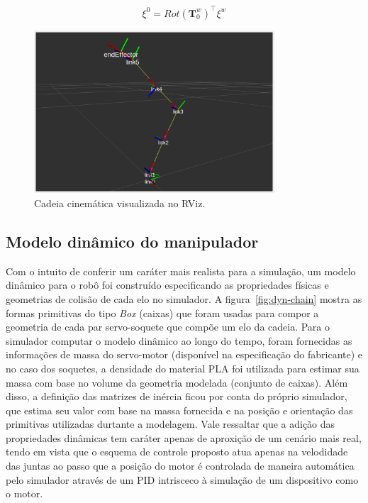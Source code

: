 \begin{equation}
    \xi^0 = {Rot(\mathbf{T}^w_0)}^\top \xi^w
\end{equation}

\begin{figure}
    \centering
    \includegraphics[width=0.8\textwidth]{./Images/rviz-chain.png}
    \caption{Cadeia cinemática visualizada no RViz.}\label{fig:kin-chain}
\end{figure}

\subsection*{Modelo dinâmico do manipulador}

Com o intuito de conferir um caráter mais realista para a simulação, um modelo
dinâmico para o robô foi construído especificando as propriedades físicas e
geometrias de colisão de cada elo no simulador. A figura~\ref{fig:dyn-chain}
mostra as formas primitivas do tipo \emph{Box} (caixas) que foram usadas para
compor a geometria de cada par servo-soquete que compõe um elo da cadeia. Para
o simulador computar o modelo dinâmico ao longo do tempo, foram fornecidas as
informações de massa do servo-motor (disponível na especificação do fabricante)
e no caso dos soquetes, a densidade do material PLA foi utilizada para estimar
sua massa com base no volume da geometria modelada (conjunto de caixas). Além
disso, a definição das matrizes de inércia ficou por conta do próprio
simulador, que estima seu valor com base na massa fornecida e na posição e
orientação das primitivas utilizadas durtante a modelagem. Vale ressaltar que a
adição das propriedades dinâmicas tem caráter apenas de aproxição de um cenário
mais real, tendo em vista que o esquema de controle proposto atua apenas na
velodidade das juntas ao passo que a posição do motor é controlada de maneira
automática pelo simulador através de um PID intrisceco à simulação de um
dispositivo como o motor.

